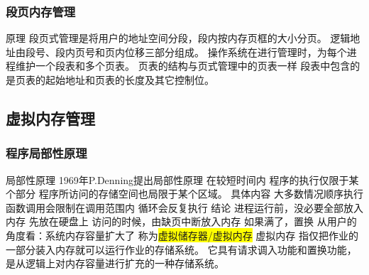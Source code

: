 \documentclass{ctexart}
\newcommand{\hl}[1]{\colorbox{yellow}{#1}}
\begin{document}
\subsubsection{段页内存管理}
\begin{outline}
    \1 原理
        \2 段页式管理是将用户的地址空间分段，段内按内存页框的大小分页。
        \2 逻辑地址由段号、段内页号和页内位移三部分组成。
        \2 操作系统在进行管理时，为每个进程维护一个段表和多个页表。
        \2 页表的结构与页式管理中的页表一样
        \2 段表中包含的是页表的起始地址和页表的长度及其它控制位。
\end{outline}
\subsection{虚拟内存管理}
\subsubsection{程序局部性原理}
\begin{outline}
    \1 局部性原理
        \2 1969年P.Denning提出局部性原理
        \2 在较短时间内
        \2 程序的执行仅限于某个部分
        \2 程序所访问的存储空间也局限于某个区域。
    \1 具体内容
        \2 大多数情况顺序执行
        \2 函数调用会限制在调用范围内
        \2 循环会反复执行
    \1 结论
        \2 进程运行前，没必要全部放入内存
            \3 先放在硬盘上
            \3 访问的时候，由缺页中断放入内存
            \3 如果满了，置换
        \2 从用户的角度看：系统内存容量扩大了
            \3 称为\hl{虚拟储存器/虚拟内存}
    \1 虚拟内存
        \2 指仅把作业的一部分装入内存就可以运行作业的存储系统。
        \2 它具有请求调入功能和置换功能，是从逻辑上对内存容量进行扩充的一种存储系统。

\end{outline}
\end{document}
